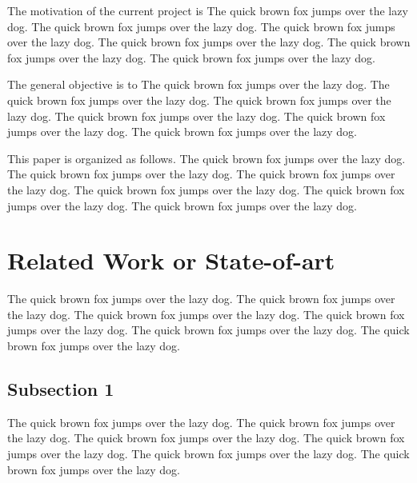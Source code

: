 \documentclass[conference]{IEEEtran}
\begin{document}
The motivation of the current project is
The quick brown fox jumps over the lazy dog. The quick brown fox jumps over the lazy dog. The quick brown fox jumps over the lazy dog. The quick brown fox jumps over the lazy dog. The quick brown fox jumps over the lazy dog. The quick brown fox jumps over the lazy dog. 

The general objective is to
The quick brown fox jumps over the lazy dog. The quick brown fox jumps over the lazy dog. The quick brown fox jumps over the lazy dog. The quick brown fox jumps over the lazy dog. The quick brown fox jumps over the lazy dog. The quick brown fox jumps over the lazy dog. 

This paper is organized as follows. The quick brown fox jumps over the lazy dog. The quick brown fox jumps over the lazy dog. The quick brown fox jumps over the lazy dog. The quick brown fox jumps over the lazy dog. The quick brown fox jumps over the lazy dog. The quick brown fox jumps over the lazy dog. 

\section{Related Work or State-of-art}
\label{sec:soa}

The quick brown fox jumps over the lazy dog. The quick brown fox jumps over the lazy dog. The quick brown fox jumps over the lazy dog. The quick brown fox jumps over the lazy dog. The quick brown fox jumps over the lazy dog. The quick brown fox jumps over the lazy dog. 

\subsection{Subsection 1}
\label{subsec:sec1}

The quick brown fox jumps over the lazy dog. The quick brown fox jumps over the lazy dog. The quick brown fox jumps over the lazy dog. The quick brown fox jumps over the lazy dog. The quick brown fox jumps over the lazy dog. The quick brown fox jumps over the lazy dog. 
\end{document}
